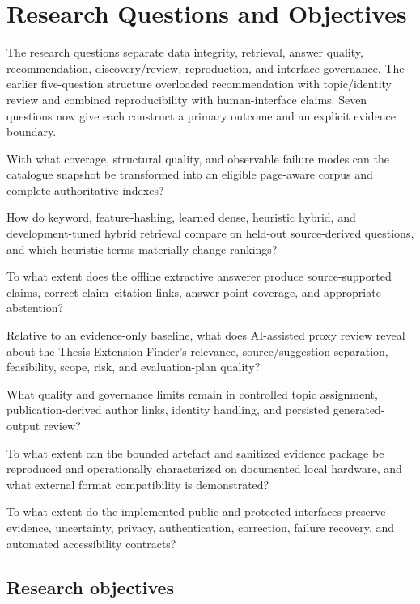 \chapter{Research Questions and Objectives}
\label{ch:rqs}

The research questions separate data integrity, retrieval, answer quality, recommendation, discovery/review, reproduction, and interface governance. The earlier five-question structure overloaded recommendation with topic/identity review and combined reproducibility with human-interface claims. Seven questions now give each construct a primary outcome and an explicit evidence boundary.

\begin{description}[leftmargin=16mm,style=multiline]
  \item[RQ1] With what coverage, structural quality, and observable failure modes can the catalogue snapshot be transformed into an eligible page-aware corpus and complete authoritative indexes?
  \item[RQ2] How do keyword, feature-hashing, learned dense, heuristic hybrid, and development-tuned hybrid retrieval compare on held-out source-derived questions, and which heuristic terms materially change rankings?
  \item[RQ3] To what extent does the offline extractive answerer produce source-supported claims, correct claim--citation links, answer-point coverage, and appropriate abstention?
  \item[RQ4] Relative to an evidence-only baseline, what does AI-assisted proxy review reveal about the Thesis Extension Finder's relevance, source/suggestion separation, feasibility, scope, risk, and evaluation-plan quality?
  \item[RQ5] What quality and governance limits remain in controlled topic assignment, publication-derived author links, identity handling, and persisted generated-output review?
  \item[RQ6] To what extent can the bounded artefact and sanitized evidence package be reproduced and operationally characterized on documented local hardware, and what external format compatibility is demonstrated?
  \item[RQ7] To what extent do the implemented public and protected interfaces preserve evidence, uncertainty, privacy, authentication, correction, failure recovery, and automated accessibility contracts?
\end{description}

\section{Research objectives}

